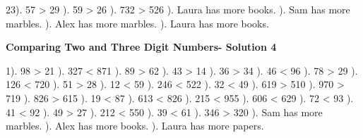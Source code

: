 \documentclass{article}%
\begin{document}
23). 57 > 29%
). 59 > 26%
). 732 > 526%
). Laura has more books.%
). Sam has more marbles.%
). Alex has more marbles.%
). Laura has more books.%
\newline%
\newpage%
\large%
\begin{center}%
\textbf{Comparing Two and Three Digit Numbers- Solution 4}%
\newline%
\end{center} \normalsize%
1). 98 > 21%
). 327 < 871%
). 89 > 62%
). 43 > 14%
). 36 > 34%
). 46 < 96%
). 78 > 29%
). 126 < 720%
). 51 > 28%
). 12 < 59%
). 246 < 522%
). 32 < 49%
). 619 > 510%
). 970 > 719%
). 826 > 615%
). 19 < 87%
). 613 < 826%
). 215 < 955%
). 606 < 629%
). 72 < 93%
). 41 < 92%
). 49 > 27%
). 212 < 550%
). 39 < 61%
). 346 > 320%
). Sam has more marbles.%
). Alex has more books.%
). Laura has more papers.%
\newline%
\end{document}
